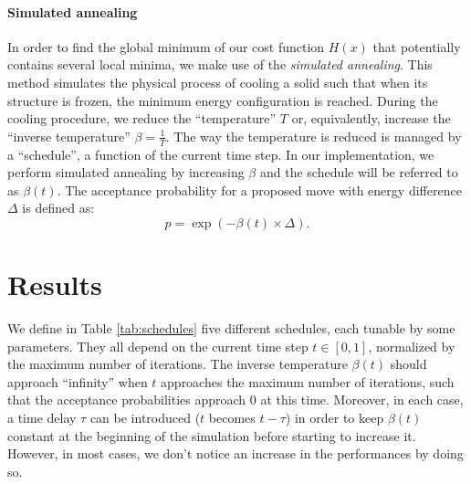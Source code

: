 \documentclass{article}
\begin{document}
  \paragraph{Simulated annealing}
  In order to find the global minimum of our cost function $H(x)$ that potentially contains several local minima, we make use of the \textit{simulated annealing}. This method simulates the physical process of cooling a solid such that when its structure is frozen, the minimum energy configuration is reached. During the cooling procedure, we reduce the ``temperature'' $T$ or, equivalently, increase the ``inverse temperature'' $\beta=\frac{1}{T}$. The way the temperature is reduced is managed by a ``schedule'', a function of the current time step. In our implementation, we perform simulated annealing by increasing $\beta$ and the schedule will be referred to as $\beta(t)$. The acceptance probability for a proposed move with energy difference $\Delta$ is defined as:
  \[
    p = \exp(- \beta(t) \times \Delta).
  \]

  \section*{Results}

  We define in Table \ref{tab:schedules} five different schedules, each tunable by some parameters. They all depend on the current time step $t \in [0, 1]$, normalized by the maximum number of iterations. The inverse temperature $\beta(t)$ should approach ``infinity'' when $t$ approaches the maximum number of iterations, such that the acceptance probabilities approach $0$ at this time. Moreover, in each case, a time delay $\tau$ can be introduced ($t$ becomes $t-\tau$) in order to keep $\beta(t)$ constant at the beginning of the simulation before starting to increase it. However, in most cases, we don't notice an increase in the performances by doing so.
\end{document}
